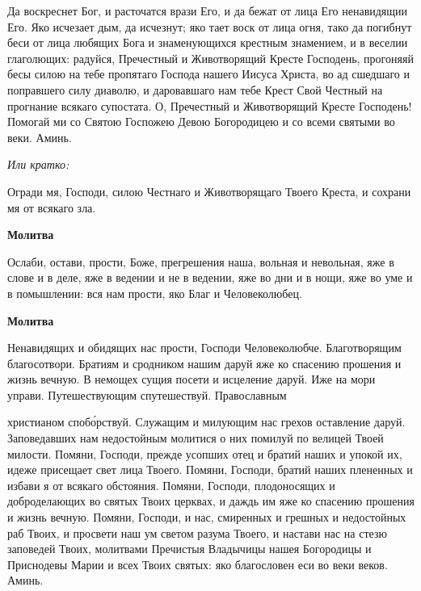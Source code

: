    Да воскреснет Бог, и расточатся врази Его, и да бежат от лица Его
ненавидящии Его. Яко исчезает дым, да исчезнут; яко тает воск от лица
огня, тако да погибнут беси от лица любящих Бога и знаменующихся
крестным знамением, и в веселии глаголющих: радуйся, Пречестный и
Животворящий Кресте Господень, прогоняяй бесы силою на тебе пропятаго
Господа нашего Иисуса Христа, во ад сшедшаго и поправшего силу диаволю,
и даровавшаго нам тебе Крест Свой Честный на прогнание всякаго
супостата. О, Пречестный и Животворящий Кресте Господень! Помогай ми
со Святою Госпожею Девою Богородицею и со всеми святыми во веки.
Аминь.



 \itshape  Или кратко:\normalfont{}



   Огради мя, Господи, силою Честнаго и Животворящаго Твоего Креста, и
сохрани мя от всякаго зла.



 

\bfseries Молитва\normalfont{}


   Ослаби, остави, прости, Боже, прегрешения наша, вольная и невольная,
яже в слове и в деле, яже в ведении и не в ведении, яже во дни и
в нощи, яже во уме и в помышлении: вся нам прости, яко Благ и
Человеколюбец.



 

\bfseries Молитва\normalfont{}


   Ненавидящих и обидящих нас прости, Господи Человеколюбче.
Благотворящим благосотвори. Братиям и сродником нашим даруй яже ко
спасению прошения и жизнь вечную. В немощех сущия посети и исцеление
даруй. Иже на мори управи. Путешествующим спутешествуй. Православным

христианом спобо́рствуй. Служащим и милующим нас грехов оставление
даруй. Заповедавших нам недостойным молитися о них помилуй по велицей
Твоей милости. Помяни, Господи, прежде усопших отец и братий наших и
упокой их, идеже присещает свет лица Твоего. Помяни, Господи,
братий наших плененных и избави я от всякаго обстояния. Помяни,
Господи, плодоносящих и доброделающих во святых Твоих церквах,
и даждь им яже ко спасению прошения и жизнь вечную. Помяни,
Господи, и нас, смиренных и грешных и недостойных раб Твоих,
и просвети наш ум светом разума Твоего, и настави нас на стезю
заповедей Твоих, молитвами Пречистыя Владычицы нашея Богородицы и
Приснодевы Марии и всех Твоих святых: яко благословен еси во веки веков.
Аминь.



